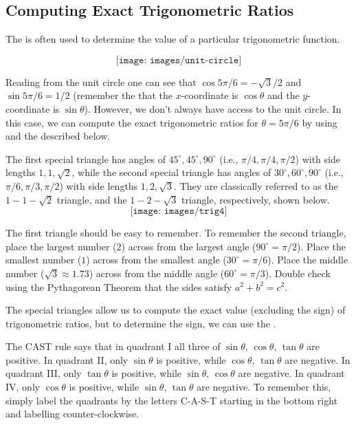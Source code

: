 \subsection{Computing Exact Trigonometric Ratios}
The  is often used to determine the  value of a particular trigonometric function.

$$\texttt{[image: images/unit-circle]}$$

Reading from the unit circle one can see that $\cos 5\pi/6=-\sqrt 3/2$ and $\sin 5\pi/6=1/2$ (remember the that the $x$-coordinate is $\cos\theta$ and the $y$-coordinate is $\sin\theta$).
However, we don't always have access to the unit circle.
In this case, we can compute the exact trigonometric ratios for $\theta=5\pi/6$ by using  and the  described below.

The first special triangle has angles of $45^\circ,45^\circ,90^\circ$ (i.e., $\pi/4,\pi/4,\pi/2$) with side lengths $1,1,\sqrt 2$, while the second special triangle has angles of $30^\circ,60^\circ,90^\circ$ (i.e., $\pi/6,\pi/3,\pi/2$) with side lengths $1,2,\sqrt 3$. They are classically referred to as the $1-1-\sqrt{2}$ triangle, and the $1-2-\sqrt{3}$ triangle, respectively, shown below.
$$\texttt{[image: images/trig4]}$$

\begin{formulabox}[Mnemonic]
The first triangle should be easy to remember. 
To remember the second triangle, place the largest number ($2$) across from the largest angle ($90^\circ=\pi/2$).
Place the smallest number ($1$) across from the smallest angle ($30^\circ=\pi/6$).
Place the middle number ($\sqrt 3\approx 1.73$) across from the middle angle ($60^\circ=\pi/3$).
Double check using the Pythagorean Theorem that the sides satisfy $a^2+b^2=c^2$.
\end{formulabox}

The special triangles allow us to compute the exact value (excluding the sign) of trigonometric ratios, but to determine the sign, we can use the .

\begin{formulabox}
The CAST rule says that in quadrant I all three of $\sin\theta$, $\cos\theta$, $\tan\theta$ are positive.
In quadrant II, only $\sin\theta$ is positive, while $\cos\theta$, $\tan\theta$ are negative.
In quadrant III, only $\tan\theta$ is positive, while $\sin\theta$, $\cos\theta$ are negative.
In quadrant IV, only $\cos\theta$ is positive, while $\sin\theta$, $\tan\theta$ are negative. 
To remember this, simply label the quadrants by the letters C-A-S-T starting in the bottom right and labelling counter-clockwise.
\end{formulabox} 

